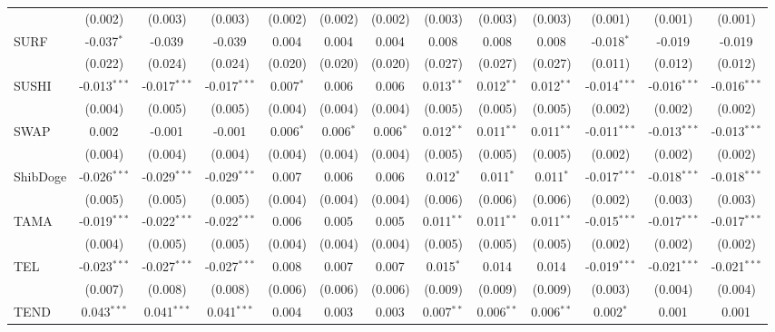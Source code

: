 \begin{table}[!htbp]
\begin{tabular}{@{\extracolsep{5pt}}lcccccccccccc}
  & (0.002) & (0.003) & (0.003) & (0.002) & (0.002) & (0.002) & (0.003) & (0.003) & (0.003) & (0.001) & (0.001) & (0.001) \\
 SURF & -0.037$^{*}$ & -0.039$^{}$ & -0.039$^{}$ & 0.004$^{}$ & 0.004$^{}$ & 0.004$^{}$ & 0.008$^{}$ & 0.008$^{}$ & 0.008$^{}$ & -0.018$^{*}$ & -0.019$^{}$ & -0.019$^{}$ \\
  & (0.022) & (0.024) & (0.024) & (0.020) & (0.020) & (0.020) & (0.027) & (0.027) & (0.027) & (0.011) & (0.012) & (0.012) \\
 SUSHI & -0.013$^{***}$ & -0.017$^{***}$ & -0.017$^{***}$ & 0.007$^{*}$ & 0.006$^{}$ & 0.006$^{}$ & 0.013$^{**}$ & 0.012$^{**}$ & 0.012$^{**}$ & -0.014$^{***}$ & -0.016$^{***}$ & -0.016$^{***}$ \\
  & (0.004) & (0.005) & (0.005) & (0.004) & (0.004) & (0.004) & (0.005) & (0.005) & (0.005) & (0.002) & (0.002) & (0.002) \\
 SWAP & 0.002$^{}$ & -0.001$^{}$ & -0.001$^{}$ & 0.006$^{*}$ & 0.006$^{*}$ & 0.006$^{*}$ & 0.012$^{**}$ & 0.011$^{**}$ & 0.011$^{**}$ & -0.011$^{***}$ & -0.013$^{***}$ & -0.013$^{***}$ \\
  & (0.004) & (0.004) & (0.004) & (0.004) & (0.004) & (0.004) & (0.005) & (0.005) & (0.005) & (0.002) & (0.002) & (0.002) \\
 ShibDoge & -0.026$^{***}$ & -0.029$^{***}$ & -0.029$^{***}$ & 0.007$^{}$ & 0.006$^{}$ & 0.006$^{}$ & 0.012$^{*}$ & 0.011$^{*}$ & 0.011$^{*}$ & -0.017$^{***}$ & -0.018$^{***}$ & -0.018$^{***}$ \\
  & (0.005) & (0.005) & (0.005) & (0.004) & (0.004) & (0.004) & (0.006) & (0.006) & (0.006) & (0.002) & (0.003) & (0.003) \\
 TAMA & -0.019$^{***}$ & -0.022$^{***}$ & -0.022$^{***}$ & 0.006$^{}$ & 0.005$^{}$ & 0.005$^{}$ & 0.011$^{**}$ & 0.011$^{**}$ & 0.011$^{**}$ & -0.015$^{***}$ & -0.017$^{***}$ & -0.017$^{***}$ \\
  & (0.004) & (0.005) & (0.005) & (0.004) & (0.004) & (0.004) & (0.005) & (0.005) & (0.005) & (0.002) & (0.002) & (0.002) \\
 TEL & -0.023$^{***}$ & -0.027$^{***}$ & -0.027$^{***}$ & 0.008$^{}$ & 0.007$^{}$ & 0.007$^{}$ & 0.015$^{*}$ & 0.014$^{}$ & 0.014$^{}$ & -0.019$^{***}$ & -0.021$^{***}$ & -0.021$^{***}$ \\
  & (0.007) & (0.008) & (0.008) & (0.006) & (0.006) & (0.006) & (0.009) & (0.009) & (0.009) & (0.003) & (0.004) & (0.004) \\
 TEND & 0.043$^{***}$ & 0.041$^{***}$ & 0.041$^{***}$ & 0.004$^{}$ & 0.003$^{}$ & 0.003$^{}$ & 0.007$^{**}$ & 0.006$^{**}$ & 0.006$^{**}$ & 0.002$^{*}$ & 0.001$^{}$ & 0.001$^{}$ \\

\end{tabular}
\end{table}
